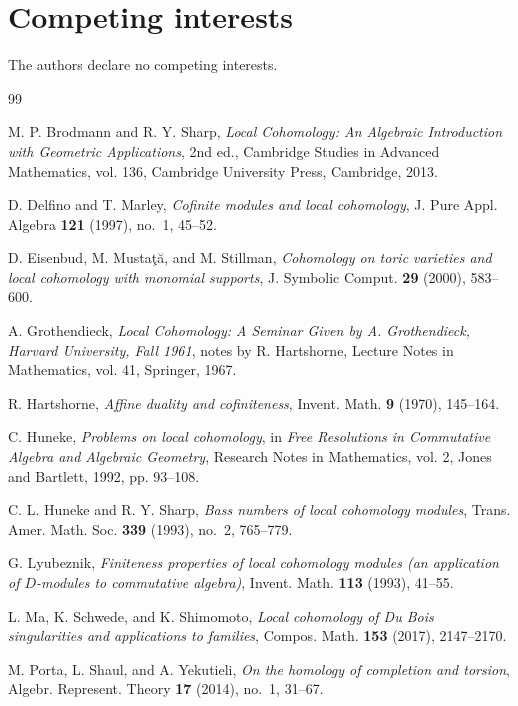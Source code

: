 \documentclass[11pt,reqno]{amsart}
\theoremstyle{definition}
\theoremstyle{remark}
\begin{document}
\section*{Competing interests}
The authors declare no competing interests.
\begin{thebibliography}{99}

 M. P. Brodmann and R. Y. Sharp, \emph{Local Cohomology: An Algebraic Introduction with Geometric Applications}, 2nd ed., Cambridge Studies in Advanced Mathematics, vol. 136, Cambridge University Press, Cambridge, 2013.

 D. Delfino and T. Marley, \emph{Cofinite modules and local cohomology}, J. Pure Appl. Algebra \textbf{121} (1997), no.~1, 45--52.

 D. Eisenbud, M. Musta\c{t}\u{a}, and M. Stillman, \emph{Cohomology on toric varieties and local cohomology with monomial supports}, J. Symbolic Comput. \textbf{29} (2000), 583--600.

 A. Grothendieck, \emph{Local Cohomology: A Seminar Given by A. Grothendieck, Harvard University, Fall 1961}, notes by R. Hartshorne, Lecture Notes in Mathematics, vol. 41, Springer, 1967.

 R. Hartshorne, \emph{Affine duality and cofiniteness}, Invent. Math. \textbf{9} (1970), 145--164.

 C. Huneke, \emph{Problems on local cohomology}, in \emph{Free Resolutions in Commutative Algebra and Algebraic Geometry}, Research Notes in Mathematics, vol. 2, Jones and Bartlett, 1992, pp. 93--108.

 C. L. Huneke and R. Y. Sharp, \emph{Bass numbers of local cohomology modules}, Trans. Amer. Math. Soc. \textbf{339} (1993), no.~2, 765--779.

 G. Lyubeznik, \emph{Finiteness properties of local cohomology modules (an application of $D$-modules to commutative algebra)}, Invent. Math. \textbf{113} (1993), 41--55.

 L. Ma, K. Schwede, and K. Shimomoto, \emph{Local cohomology of Du Bois singularities and applications to families}, Compos. Math. \textbf{153} (2017), 2147--2170.

 M. Porta, L. Shaul, and A. Yekutieli, \emph{On the homology of completion and torsion}, Algebr. Represent. Theory \textbf{17} (2014), no.~1, 31--67.


\end{thebibliography}
\end{document}
